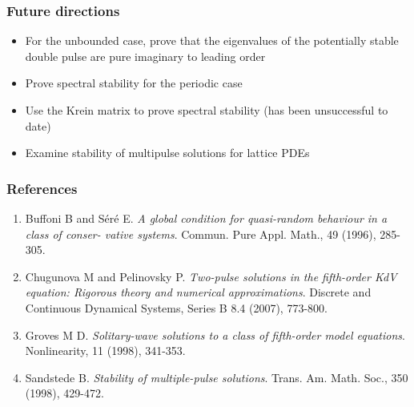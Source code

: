 \documentclass[16pt]{beamer}
\begin{document}
\begin{frame}
	\frametitle{Future directions}
	\fontsize{16}{7.2}\selectfont
	\begin{itemize}
		\item For the unbounded case, prove that the eigenvalues of the potentially stable double pulse are pure imaginary to leading order
		\item Prove spectral stability for the periodic case
		\item Use the Krein matrix to prove spectral stability (has been unsuccessful to date)
		\item Examine stability of multipulse solutions for lattice PDEs
	\end{itemize}
\end{frame}

\begin{frame}
	\frametitle{References}
	\fontsize{12}{7.2}\selectfont
	\begin{enumerate}
		\item Buffoni B and S\'er\'e E. \emph{A global condition for quasi-random behaviour in a class of conser- vative systems}. Commun. Pure Appl. Math., 49 (1996), 285-305.
		\item Chugunova M and Pelinovsky P. \emph{Two-pulse solutions in the fifth-order KdV equation: Rigorous theory and numerical approximations}. Discrete and Continuous Dynamical Systems, Series B 8.4 (2007), 773-800.
		\item Groves M D. \emph{Solitary-wave solutions to a class of fifth-order model equations}. Nonlinearity, 11 (1998), 341-353.
		\item Sandstede B. \emph{Stability of multiple-pulse solutions}. Trans. Am. Math. Soc., 350 (1998), 429-472.
	\end{enumerate}
\end{frame}
 
\end{document}
